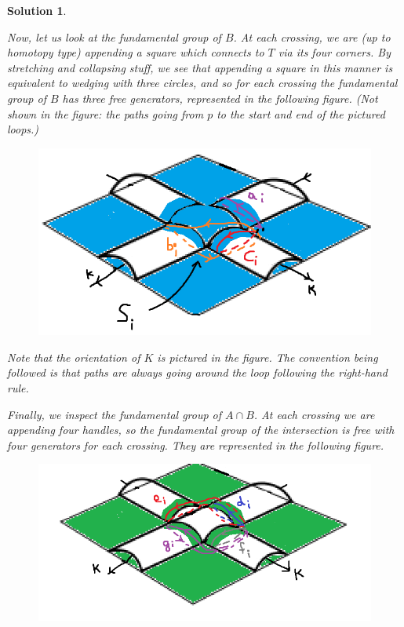 \documentclass{article}
\theoremstyle{plain}
\theoremstyle{nonumberplain}
\newtheorem{sol}{Solution}
\begin{document}
\begin{sol}
\begin{enumerate}
Now, let us look at the fundamental group of $B$. At each crossing, we are (up to homotopy type) appending a square which connects to $T$ via its four corners. By stretching and collapsing stuff, we see that appending a square in this manner is equivalent to wedging with three circles, and so for each crossing the fundamental group of $B$ has three free generators, represented in the following figure. (Not shown in the figure: the paths going from $p$ to the start and end of the pictured loops.)
\begin{figure}[H]
\centering
\includegraphics{knot2}
\end{figure}
Note that the orientation of $K$ is pictured in the figure. The convention being followed is that paths are always going around the loop following the right-hand rule.

Finally, we inspect the fundamental group of $A \cap B$. At each crossing we are appending four handles, so the fundamental group of the intersection is free with four generators for each crossing. They are represented in the following figure.
\begin{figure}[H]
\centering
\includegraphics{knot3}
\end{figure}


\end{enumerate}
\end{sol}
\end{document}
